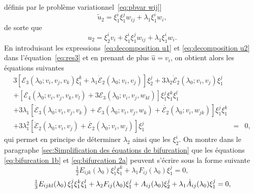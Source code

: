 \documentclass{article}
\newcommand{\nocomma}{}
\begin{document}
d{\'e}finis par le probl{\`e}me variationnel~\eqref{eq:pbvar wij}]
\begin{equation}
  \tilde{u}_2 = \xi_1^i \xi_1^j w_{i \nocomma j} + \lambda_1 \xi_1^i w_i,
\end{equation}
de sorte que
\begin{equation}
  \label{eq:decomposition u2} u_2 = \xi_2^i v_i + \xi_1^i \xi_1^j w_{i
  \nocomma j} + \lambda_1 \xi_1^i w_i .
\end{equation}
En introduisant les expressions~\eqref{eq:decomposition u1} et
\eqref{eq:decomposition u2} dans l'{\'e}quation~\eqref{eq:res3} et en prenant
de plus $\hat{u} = v_i$, on obtient alors les {\'e}quations suivantes
\begin{eqnarray}
  3 [\mathcal{E}_3 (\lambda_0 ; v_i, v_j, v_k) \xi_1^k + \lambda_1
  \dot{\mathcal{E}}_2 (\lambda_0 ; v_i, v_j)] \xi_2^j + 3 \lambda_2
  \dot{\mathcal{E}}_2 (\lambda_0 ; v_i, v_j) \xi_1^j &  &  \nonumber\\
  + [\mathcal{E}_4 (\lambda_0 ; v_i, v_j, v_k, v_l) + 3\mathcal{E}_3
  (\lambda_0 ; v_i, v_j, w_{k \nocomma l})] \xi_1^j \xi_1^k \xi_1^l &  &
  \nonumber\\
  + 3 \lambda_1  [\dot{\mathcal{E}}_3 (\lambda_0 ; v_i, v_j, v_k)
  +\mathcal{E}_3 (\lambda_0 ; v_i, v_j, w_k) + \dot{\mathcal{E}_2} (\lambda_0
  ; v_i, w_{j \nocomma k})] \xi_1^j \xi_1^k &  &  \nonumber\\
  + 3 \lambda_1^2  [\ddot{\mathcal{E}}_2 (\lambda_0 ; v_i, v_j) +
  \dot{\mathcal{E}_2} (\lambda_0 ; v_i, w_j)] \xi_1^j & = & 0,
  \label{eq:bifurcation 2a}
\end{eqnarray}
qui permet en principe de d{\'e}terminer $\lambda_2$ ainsi que les $\xi_2^i$.
On montre dans le paragraphe \ref{sec:Simplification des équations de
bifurcation} que les {\'e}quations \eqref{eq:bifurcation 1b} et
\eqref{eq:bifurcation 2a} peuvent s'{\'e}crire sous la forme suivante
\begin{equation}
  \label{eq:bifurcation 1c} \tfrac{1}{2} E_{i \nocomma j \nocomma k}
  (\lambda_0) \xi_1^j \xi_1^k + \lambda_1 F_{i \nocomma j} (\lambda_0) \xi_1^j
  = 0,
\end{equation}
\begin{equation}
  \label{eq:bifurcation 2b} \tfrac{1}{3} E_{i \nocomma j \nocomma k \nocomma
  l} (\lambda_0)  \hspace{0.17em} \xi_1^j \xi_1^k \xi_1^l + \lambda_2 F_{i
  \nocomma j} (\lambda_0) \xi_1^j + A_{i \nocomma j} (\lambda_0) \xi_2^j +
  \lambda_1  \dot{A}_{i \nocomma j} (\lambda_0) \xi_1^j = 0,
\end{equation}
\end{document}
